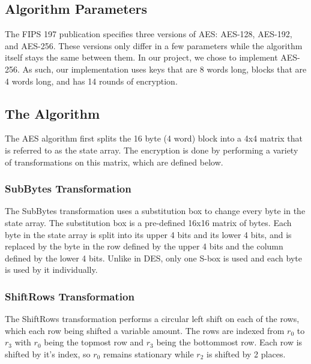 	\subsection{Algorithm Parameters}\label{sec:aes-param}
		The FIPS 197 publication specifies three versions of AES: AES-128, AES-192, and AES-256. These versions only differ in a few parameters while the algorithm itself stays the same
		between them. In our project, we chose to implement AES-256. As such, our implementation uses keys that are 8 words long, blocks that are 4 words long, and has 14 rounds of encryption.

	\subsection{The Algorithm}\label{sec:aes-alg}
		The AES algorithm first splits the 16 byte (4 word) block into a 4x4 matrix that is referred to as the state array. The encryption is done by performing a variety of transformations on
		this matrix, which are defined below.

		\subsubsection{SubBytes Transformation}\label{sec:aes-subbytes}
			The SubBytes transformation uses a substitution box to change every byte in the state array. The substitution box is a pre-defined 16x16 matrix of bytes. Each byte in the state array
			is split into its upper 4 bits and its lower 4 bits, and is replaced by the byte in the row defined by the upper 4 bits and the column defined by the lower 4 bits. Unlike in DES,
			only one S-box is used and each byte is used by it individually.

		\subsubsection{ShiftRows Transformation}\label{sec:aes-shiftrows}
			The ShiftRows transformation performs a circular left shift on each of the rows, which each row being shifted a variable amount. The rows are indexed from $r_0$ to $r_3$ with $r_0$
			being the topmost row and $r_3$ being the bottommost row. Each row is shifted by it's index, so $r_0$ remains stationary while $r_2$ is shifted by 2 places.

